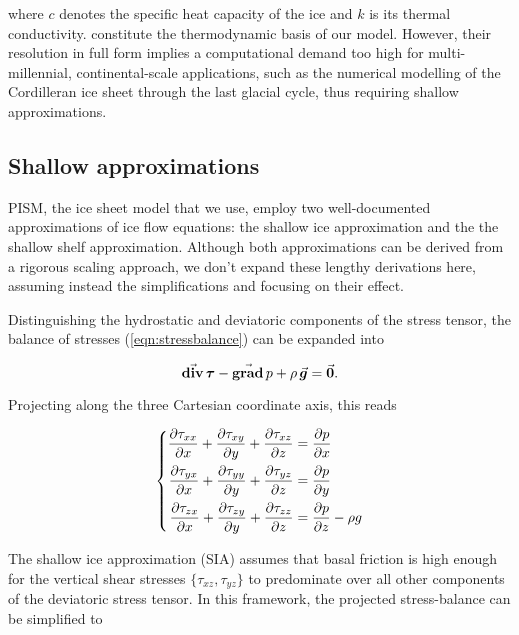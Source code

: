 \documentclass{article}
\newcommand{\vect}[1]{\va*{#1}} %
\newcommand{\tens}[1]{\vb*{#1}} %
\renewcommand{\grad}[1]{\vect{\mathrm{grad}}\,#1}   %
\newcommand{\tdiv}[1]{\vect{\mathrm{div}}\,#1}      %
\newcommand{\DST}[0]{\tens{\tau}}       %
\begin{document}
where $c$ denotes the specific heat capacity of the ice and $k$ is its thermal
conductivity.  constitute the thermodynamic basis
of our model. However, their resolution in full form implies a computational
demand too high for multi-millennial, continental-scale applications, such as
the numerical modelling of the Cordilleran ice sheet through the last glacial
cycle, thus requiring shallow approximations.

\subsection{Shallow approximations}

PISM, the ice sheet model that we use, employ two well-documented
approximations of ice flow equations: the shallow ice approximation and the
the shallow shelf approximation. Although both approximations can be derived
from a rigorous scaling approach, we don't expand these lengthy derivations
here, assuming instead the simplifications and focusing on their effect.


Distinguishing the hydrostatic and deviatoric components of the stress tensor,
the balance of stresses (\ref{eqn:stressbalance}) can be expanded into

\begin{equation}
    \tdiv{\DST} - \grad{p} + \rho\,\vect{g} = \vect{0}.
\end{equation}

Projecting along the three Cartesian coordinate axis, this reads

\begin{equation}
    \label{eqn:fullstokes}
    \left\{\begin{aligned}
        \pdv{\tau_{xx}}{x} + \pdv{\tau_{xy}}{y} + \pdv{\tau_{xz}}{z}
            &= \pdv{p}{x} \\
        \pdv{\tau_{yx}}{x} + \pdv{\tau_{yy}}{y} + \pdv{\tau_{yz}}{z}
            &= \pdv{p}{y} \\
        \pdv{\tau_{zx}}{x} + \pdv{\tau_{zy}}{y} + \pdv{\tau_{zz}}{z}
            &= \pdv{p}{z} - \rho g
    \end{aligned}\right.
\end{equation}

The shallow ice approximation (SIA) assumes that basal friction is high enough
for the vertical shear stresses $\{\tau_{xz}, \tau_{yz}\}$ to predominate over
all other components of the deviatoric stress tensor. In this framework, the
projected stress-balance can be simplified to
\end{document}
